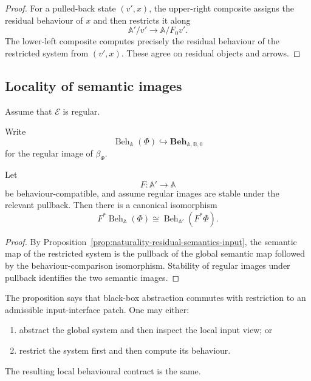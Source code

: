 \begin{proof}
For a pulled-back state \((v',x)\), the upper-right composite assigns the
residual behaviour of \(x\) and then restricts it along
\[
    \mathbb A'/v'\to\mathbb A/F_0v'.
\]
The lower-left composite computes precisely the residual behaviour of the
restricted system from \((v',x)\). These agree on residual objects and arrows.
\end{proof}

\subsection{Locality of semantic images}
\label{subsec:locality-semantic-images}

Assume that \(\mathcal E\) is regular.

Write
\[
    \operatorname{Beh}_{\mathbb A}(\Phi)
    \hookrightarrow
    \mathbf{Beh}_{\mathbb A,\mathbb B,0}
\]
for the regular image of \(\beta_\Phi\).

\begin{proposition}
\label{prop:behavioural-abstraction-input-restriction}
Let
\[
    F:\mathbb A'\to\mathbb A
\]
be behaviour-compatible, and assume regular images are stable under the
relevant pullback. Then there is a canonical isomorphism
\[
    F^\ast
    \operatorname{Beh}_{\mathbb A}(\Phi)
    \cong
    \operatorname{Beh}_{\mathbb A'}(F^\ast\Phi).
\]
\end{proposition}

\begin{proof}
By Proposition~\ref{prop:naturality-residual-semantics-input}, the semantic map
of the restricted system is the pullback of the global semantic map followed
by the behaviour-comparison isomorphism. Stability of regular images under
pullback identifies the two semantic images.
\end{proof}

\begin{remark}
\label{rem:black-boxing-local-observation}
The proposition says that black-box abstraction commutes with restriction to
an admissible input-interface patch. One may either:
\begin{enumerate}
    \item abstract the global system and then inspect the local input view; or
    \item restrict the system first and then compute its behaviour.
\end{enumerate}
The resulting local behavioural contract is the same.
\end{remark}

